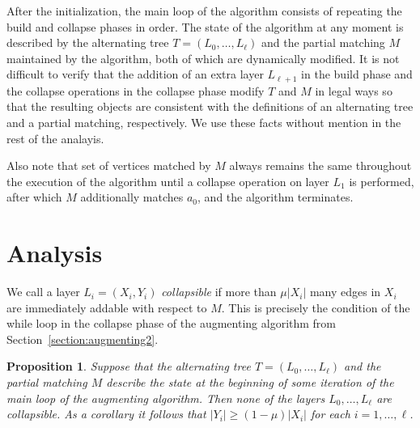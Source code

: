 \documentclass[11pt]{article}
\newtheorem{proposition}[theorem]{Proposition}
\theoremstyle{definition}
\theoremstyle{remark}
\begin{document}
After the initialization, the main loop of the algorithm consists of
repeating the build and collapse phases in order. The state of the
algorithm at any moment is described by the alternating tree
$T=(L_0,\dots,L_\ell)$ and the partial matching $M$ maintained by the
algorithm, both of which are dynamically modified. It is not difficult
to verify that the addition of an extra layer $L_{\ell+1}$ in the
build phase and the collapse operations in the collapse phase modify
$T$ and $M$ in legal ways so that the resulting objects are consistent
with the definitions of an alternating tree and a partial matching,
respectively. We use these
facts without mention in the rest of the analayis.

Also note that set of vertices matched by $M$ always remains the same
throughout the execution of the algorithm until a collapse operation
on layer $L_1$ is performed, after which $M$ additionally matches
$a_0$, and the algorithm terminates.

 


\section{Analysis}\label{section:analysis}
We call a layer $L_i = (X_i, Y_i)$ \emph{collapsible} if more than $\mu|X_i|$ many edges in $X_i$ are immediately addable with respect to $M$. This is precisely the condition of the while loop in the collapse phase of the augmenting algorithm from Section~\ref{section:augmenting2}.



\begin{proposition}\label{lem:notcollapsible}
  Suppose that the alternating tree $T=(L_0,\dots,L_\ell)$ and the
  partial matching $M$ describe the state at the beginning of some
  iteration of the main loop of the augmenting algorithm. Then none of
  the layers $L_0,\dots,L_\ell$ are collapsible. As a corollary it
  follows that $|Y_{i}| \geq (1-\mu)|X_i|$ for each $i=1,\dots,\ell$.
\end{proposition}
\end{document}
